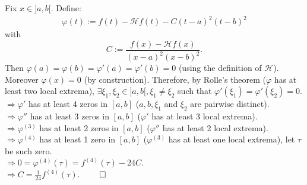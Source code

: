\begin{problem}
\begin{solution}
 Fix $x \in ]a,b[$. Define:
 \begin{align}
  \varphi(t) := f(t) - \mathcal{H}f(t) - C (t-a)^2(t-b)^2
 \end{align}
 with
 \[
C := \frac{f(x) - \mathcal{H}f(x)}{(x-a)^2(x-b)^2}.
 \]
 Then $\varphi(a) = \varphi(b) = \varphi'(a) = \varphi'(b) = 0$ (using the definition of $\mathcal{H}$). Moreover $\varphi(x) = 0$ (by construction). Therefore, by Rolle's theorem ($\varphi$ has at least two local extrema), $\exists \xi_1, \xi_2 \in ]a,b[, \xi_1 \neq \xi_2$ such that $\varphi'(\xi_1) = \varphi'(\xi_2) = 0$. \\
 $\Rightarrow \varphi'$ has at least 4 zeros in $[a,b]$ ($a, b, \xi_1$ and $\xi_2$ are pairwise distinct). \\
 $\Rightarrow \varphi''$ has at least 3 zeros in $[a,b]$ ($\varphi'$ has at least 3 local extrema). \\
 $\Rightarrow \varphi^{(3)}$ has at least 2 zeros in $[a,b]$ ($\varphi''$ has at least 2 local extrema). \\
 $\Rightarrow \varphi^{(4)}$ has at least 1 zero in $[a,b]$ ($\varphi^{(3)}$ has at least one local extrema), let $\tau$ be such zero. \\
 $\Rightarrow 0 = \varphi^{(4)}(\tau) = f^{(4)}(\tau) - 24 C$. \\
 $\Rightarrow C = \frac{1}{24} f^{(4)}(\tau)$. $\qed$
\end{solution}

\end{problem}
